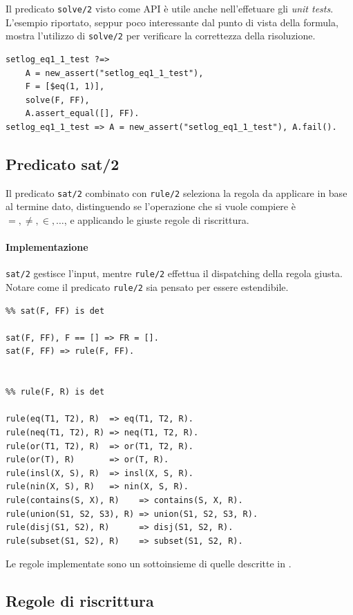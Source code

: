 \documentclass[12pt,a4paper,openright]{book} %
\begin{document}
Il predicato \verb|solve/2| visto come API è utile anche nell'effetuare gli \emph{unit tests}. L'esempio riportato, seppur poco interessante dal punto di vista della formula, mostra l'utilizzo di \verb|solve/2| per verificare la correttezza della risoluzione.
\begin{verbatim}
setlog_eq1_1_test ?=>
    A = new_assert("setlog_eq1_1_test"),
    F = [$eq(1, 1)],
    solve(F, FF),
    A.assert_equal([], FF).
setlog_eq1_1_test => A = new_assert("setlog_eq1_1_test"), A.fail().
\end{verbatim}

\subsection{Predicato sat/2}
Il predicato \verb|sat/2| combinato con \verb|rule/2| seleziona la regola da applicare in base al termine dato, distinguendo se l'operazione che si vuole compiere è $=, \neq, \in, \ldots$, e applicando le giuste regole di riscrittura. 

\paragraph{Implementazione} \verb|sat/2| gestisce l'input, mentre \verb|rule/2| effettua il dispatching della regola giusta. Notare come il predicato \verb|rule/2| sia pensato per essere estendibile.
\begin{verbatim}
%% sat(F, FF) is det

sat(F, FF), F == [] => FR = [].
sat(F, FF) => rule(F, FF).


%% rule(F, R) is det

rule(eq(T1, T2), R)  => eq(T1, T2, R).
rule(neq(T1, T2), R) => neq(T1, T2, R).
rule(or(T1, T2), R)  => or(T1, T2, R).
rule(or(T), R)       => or(T, R).
rule(insl(X, S), R)  => insl(X, S, R).
rule(nin(X, S), R)   => nin(X, S, R).
rule(contains(S, X), R)    => contains(S, X, R).
rule(union(S1, S2, S3), R) => union(S1, S2, S3, R).
rule(disj(S1, S2), R)      => disj(S1, S2, R).
rule(subset(S1, S2), R)    => subset(S1, S2, R).
\end{verbatim}

Le regole implementate sono un sottoinsieme di quelle descritte in \cite{Rossi18}.

\subsection{Regole di riscrittura}
\end{document}
